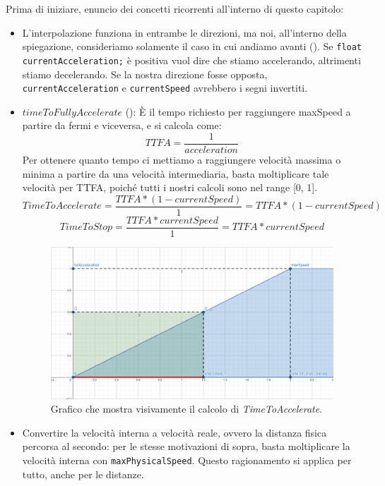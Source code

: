 \documentclass[main.tex]{subfiles}
\begin{document}
\noindent Prima di iniziare, enuncio dei concetti ricorrenti all'interno di questo capitolo:
\begin{itemize}
    \item L'interpolazione funziona in entrambe le direzioni, ma noi, all'interno della spiegazione, consideriamo solamente il caso in cui andiamo avanti (). Se \lstinline{float currentAcceleration;} è positiva vuol dire che stiamo accelerando, altrimenti stiamo decelerando. Se la nostra direzione fosse opposta, \lstinline{currentAcceleration} e \lstinline{currentSpeed} avrebbero i segni invertiti.
    \item $timeToFullyAccelerate$ (): È il tempo richiesto per raggiungere maxSpeed a partire da fermi e viceversa, e si calcola come:
    \[TTFA = \frac{1}{acceleration}\]
    Per ottenere quanto tempo ci mettiamo a raggiungere velocità massima o minima a partire da una velocità intermediaria, basta moltiplicare tale velocità per TTFA, poiché tutti i nostri calcoli sono nel range [0, 1].
    \[TimeToAccelerate = \frac{TTFA * (1 - currentSpeed)}{1} = TTFA * (1 - currentSpeed)\]
    \[TimeToStop = \frac{TTFA * currentSpeed}{1} = TTFA * currentSpeed\]
    \begin{figure}[H]
        \centering
        \includegraphics[width=.65\linewidth]{img/interpolazione/timeToFullyAccelerate.png}
        \caption{Grafico che mostra visivamente il calcolo di \textit{TimeToAccelerate}.}
        \label{fig:4_timeToFullyAccelerate}
    \end{figure}
    \item Convertire la velocità interna a velocità reale, ovvero la distanza fisica percorsa al secondo: per le stesse motivazioni di sopra, basta moltiplicare la velocità interna con \lstinline{maxPhysicalSpeed}. Questo ragionamento si applica per tutto, anche per le distanze.
\end{itemize}
\end{document}
